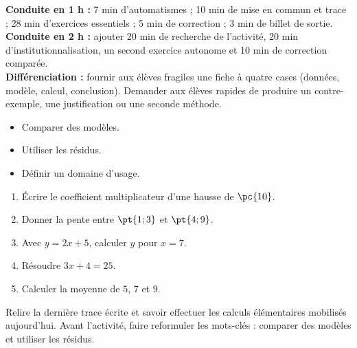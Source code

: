 \ifmxteacher
\begin{method}
\textbf{Conduite en 1 h :} 7 min d'automatismes ; 10 min de mise en commun et trace ; 28 min d'exercices essentiels ; 5 min de correction ; 3 min de billet de sortie.\\
\textbf{Conduite en 2 h :} ajouter 20 min de recherche de l'activité, 20 min d'institutionnalisation, un second exercice autonome et 10 min de correction comparée.\\
\textbf{Différenciation :} fournir aux élèves fragiles une fiche à quatre cases (données, modèle, calcul, conclusion). Demander aux élèves rapides de produire un contre-exemple, une justification ou une seconde méthode.
\end{method}
\fi
{}
\begin{objectives}\begin{itemize}\item Comparer des modèles.\item Utiliser les résidus.\item Définir un domaine d'usage.\end{itemize}\end{objectives}
\begin{fluency}\begin{enumerate}\item Écrire le coefficient multiplicateur d'une hausse de $\pc{10}$. \item Donner la pente entre $\pt{1;3}$ et $\pt{4;9}$. \item Avec $y=2x+5$, calculer $y$ pour $x=7$. \item Résoudre $3x+4=25$. \item Calculer la moyenne de $5$, $7$ et $9$. \end{enumerate}\end{fluency}
\begin{prerequisites}Relire la dernière trace écrite et savoir effectuer les calculs élémentaires mobilisés aujourd'hui. Avant l'activité, faire reformuler les mots-clés : comparer des modèles et utiliser les résidus.\end{prerequisites}

